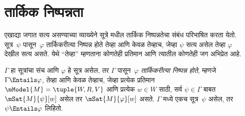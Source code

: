 \section{तार्किक निष्पन्नता}\label{nml:syn:ent:sec}

\begin{explain}
  एखाद्या जगात सत्य असण्याच्या व्याख्येने सूत्रे मधील
  तार्किक निष्पन्नतेचा संबंध परिभाषित करता येतो.
  सूत्र~$\psi$ पासून~$\varphi$ तार्किकरीत्या निष्पन्न
  होते तेव्हा आणि केवळ तेव्हाच, जेव्हा $\psi$ सत्य असेल
  तेव्हा $\varphi$ देखील सत्य असते. येथे ``तेव्हा'' म्हणताना
  कोणतेही प्रतिमान आणि त्यातील कोणतेही जग अभिप्रेत आहे.
\end{explain}

\begin{defn}
  $\Gamma$ हा सूत्रांचा संच आणि $\varphi$ हे सूत्र
  असेल, तर $\Gamma$ पासून~$\varphi$ \emph{तार्किकरीत्या
  निष्पन्न होते}, म्हणजे $\Gamma \Entails \varphi$, तेव्हा आणि
  केवळ तेव्हाच, जेव्हा प्रत्येक प्रतिमान
  $\mModel{M} = \tuple{W, R, V}$ आणि प्रत्येक $w \in W$
  साठी, सर्व $\psi \in \Gamma$ बाबत $\mSat{M}{\psi}[w]$
  असेल तर $\mSat{M}{\varphi}[w]$ असते. $\Gamma$ मध्ये
  एकच सूत्र~$\psi$ असेल, तर $\psi \Entails \varphi$ लिहितो.
\end{defn}


